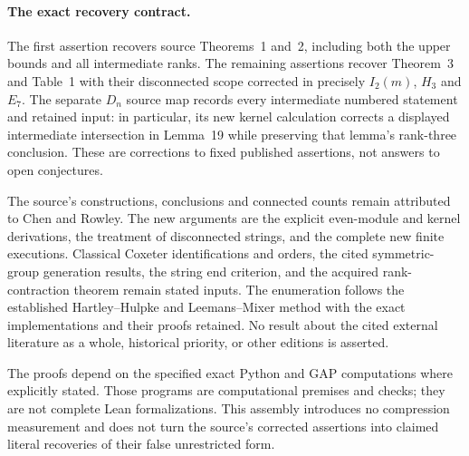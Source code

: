 \documentclass[11pt,a4paper]{article}
\begin{document}
\paragraph{The exact recovery contract.}
The first assertion recovers source Theorems~1 and~2, including
both the upper bounds and all intermediate ranks. The remaining
assertions recover Theorem~3 and Table~1 with their disconnected
scope corrected in precisely $I_2(m)$, $H_3$ and $E_7$.
The separate $D_n$ source map records every intermediate
numbered statement and retained input: in particular, its new
kernel calculation corrects a displayed intermediate intersection
in Lemma~19 while preserving that lemma's rank-three conclusion.
These are corrections to fixed published assertions, not answers
to open conjectures.

The source's constructions, conclusions and connected counts
remain attributed to Chen and Rowley. The new arguments are the
explicit even-module and kernel derivations, the treatment of
disconnected strings, and the complete new finite executions.
Classical Coxeter identifications and orders, the cited
symmetric-group generation results, the string end criterion,
and the acquired rank-contraction theorem remain stated inputs.
The enumeration follows the established Hartley--Hulpke and
Leemans--Mixer method with the exact implementations and their
proofs retained. No result about the cited external literature
as a whole, historical priority, or other editions is asserted.

The proofs depend on the specified exact Python and GAP
computations where explicitly stated. Those programs are
computational premises and checks; they are not complete Lean
formalizations. This assembly introduces no compression
measurement and does not turn the source's corrected assertions
into claimed literal recoveries of their false unrestricted form.
\end{document}

